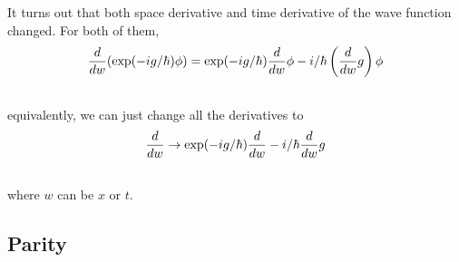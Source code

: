 \documentclass[letterpaper,10pt,english]{sphinxmanual}
\begin{document}
It turns out that both space derivative and time derivative of the wave function changed. For both of them,
\begin{gather}
\begin{split}\frac{d}{dw} (\exp(-ig/\hbar)\phi ) = \exp(-ig/\hbar)\frac{d}{dw} \phi - i/\hbar \left(\frac{d}{dw} g\right) \phi\end{split}\notag\\\begin{split}\end{split}\notag
\end{gather}
equivalently, we can just change all the derivatives to
\begin{gather}
\begin{split}\frac{d}{dw} \rightarrow  \exp(-ig/\hbar)\frac{d}{dw} - i/\hbar \frac{d}{dw} g\end{split}\notag\\\begin{split}\end{split}\notag
\end{gather}
where $w$ can be $x$ or $t$.


\subsection{Parity}
\label{symmetries:parity}
\end{document}

